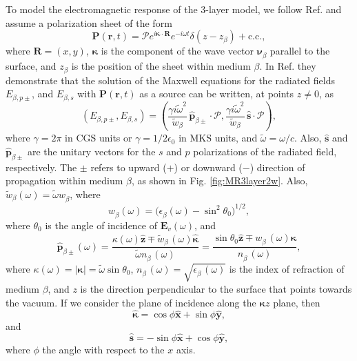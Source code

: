 To model the electromagnetic response of the 3-layer model, we follow Ref.
\cite{mizrahiJOSA88} and assume a polarization sheet of the form
\begin{equation}\label{eq:m31}
\mathbf{P}(\mathbf{r},t) = \boldsymbol{\mathcal{P}}
  e^{i\boldsymbol{\kappa}\cdot\mathbf{R}}e^{-i\omega t}\delta(z - z_{\beta}) 
+ \mathrm{c.c.},
\end{equation}
where $\mathbf{R}=(x,y)$, $\boldsymbol{\kappa}$ is the component of the wave
vector $\boldsymbol{\nu}^{\phantom{a}}_{\beta}$ parallel to the surface, and
$z_{\beta}$ is the position of the sheet within medium $\beta$. In Ref.
\cite{sipeJOSAB87} they demonstrate that the solution of the Maxwell equations
for the radiated fields $E_{\beta,p\pm}$, and $E_{\beta,s}$ with
$\mathbf{P}(\mathbf{r},t)$ as a source can be written, at points $z\neq 0$, as
\begin{equation}\label{eq:r2}
(E_{\beta,p\pm},E_{\beta,s}) = 
(\frac{\gamma i\tilde{\omega}^2}{\tilde{w}_{\beta}}
\,\hat{\mathbf{p}}_{\beta\pm}\cdot\boldsymbol{\mathcal{P}},
\frac{\gamma i\tilde{\omega}^2}{\tilde{w}_{\beta}}
\,\hat{\mathbf{s}}\cdot\boldsymbol{\mathcal{P}}),
\end{equation} 
where $\gamma=2\pi$ in CGS units or $\gamma=1/2\epsilon_{0}$ in MKS units, and
$\tilde{\omega}=\omega/c$. Also, $\hat{\mathbf{s}}$ and
$\hat{\mathbf{p}}_{\beta\pm}$ are the unitary vectors for the $s$ and $p$
polarizations of the radiated field, respectively. The $\pm$ refers to upward
($+$) or downward ($-$) direction of propagation within medium $\beta$, as shown
in Fig. \ref{fig:MR3layer2w}. Also,
$\tilde{w}^{\phantom{a}}_{\beta}(\omega)=\tilde{\omega}w^{\phantom{a}}_{\beta}$,
where
\begin{equation}\label{eq:r3}
w^{\phantom{a}}_{\beta}(\omega) = 
\big(\epsilon^{\phantom{a}}_{\beta}(\omega) - \sin^{2}\theta_{0}\big)^{1/2},
\end{equation}
where $\theta_{0}$ is the angle of incidence of $\mathbf{E}_{v}(\omega)$, and
\begin{equation}\label{eq:r4}
\hat{\mathbf{p}}^{\phantom{A}}_{\beta\pm}(\omega) =
  \frac{\kappa(\omega)\hat{\mathbf{z}}\mp 
  \tilde{w}^{\phantom{A}}_{\beta}(\omega)\hat{\boldsymbol{\kappa}}} 
  {\tilde{\omega} n^{\phantom{A}}_{\beta}(\omega)}
= \frac{\sin\theta_{0}\hat{\mathbf{z}}\mp 
  w^{\phantom{A}}_{\beta}(\omega)\hat{\boldsymbol{\kappa}}} 
  {n^{\phantom{A}}_{\beta}(\omega)},
\end{equation}
where $\kappa(\omega)=|\boldsymbol{\kappa}|=\tilde{\omega}\sin\theta_{0}$,
$n^{\phantom{A}}_{\beta}(\omega)=\sqrt{\epsilon^{\phantom{A}}_{\beta}(\omega)}$
is the index of refraction of medium $\beta$, and $z$ is the direction
perpendicular to the surface that points towards the vacuum. If we consider the
plane of incidence along the $\boldsymbol{\kappa}z$ plane, then
\begin{equation}\label{mc1}
\hat{\boldsymbol{\kappa}} = \cos\phi\hat{\mathbf{x}} + \sin\phi\hat{\mathbf{y}},
\end{equation}
and
\begin{equation}\label{mmc2}
\hat{\mathbf{s}} = -\sin\phi\hat{\mathbf{x}} + \cos\phi\hat{\mathbf{y}},
\end{equation}
where $\phi$ the angle with respect to the $x$ axis.

